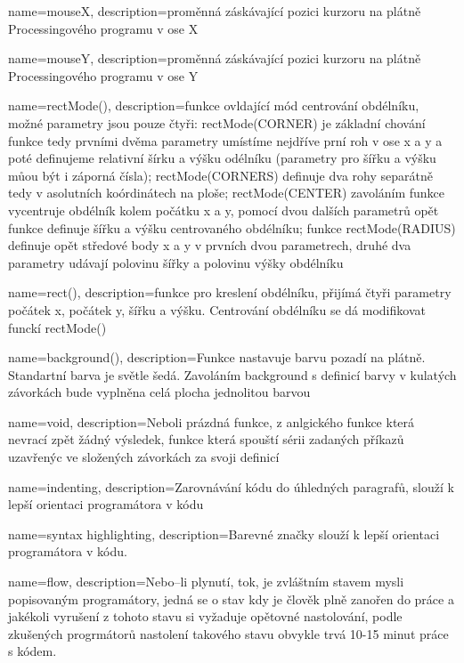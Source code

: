 {
  name={mouseX},
  description={proměnná záskávající pozici kurzoru na plátně Processingového programu v ose X}
}

{
  name={mouseY},
  description={proměnná záskávající pozici kurzoru na plátně Processingového programu v ose Y}
}

{
  name={rectMode()},
  description={funkce ovldající mód centrování obdélníku, možné parametry jsou pouze čtyři:  rectMode(CORNER) je základní chování funkce  tedy prvními dvěma parametry umístíme nejdříve prní roh v ose x a y a poté definujeme relativní šírku a výšku odélníku (parametry pro šířku a výšku můou být i záporná čísla); rectMode(CORNERS) definuje dva rohy separátně tedy v asolutních koórdinátech na ploše; rectMode(CENTER) zavoláním funkce  vycentruje obdélník kolem počátku x a y, pomocí dvou dalších parametrů opět funkce  definuje šířku a výšku centrovaného obdélníku; funkce rectMode(RADIUS) definuje opět středové body x a y v prvních dvou parametrech, druhé dva parametry udávají polovinu šířky a polovinu výšky obdélníku}
}

{
  name={rect()},
  description={funkce pro kreslení obdélníku, přijímá čtyři parametry počátek x, počátek y, šířku a výšku. Centrování obdélníku se dá modifikovat funckí rectMode()}
}

{
  name={background()},
  description={Funkce nastavuje barvu pozadí na plátně. Standartní barva je světle šedá. Zavoláním background s definicí barvy v kulatých závorkách bude vyplněna celá plocha jednolitou barvou}
}


{
  name={void},
  description={Neboli prázdná funkce, z anlgického  funkce která nevrací zpět žádný výsledek, funkce která spouští sérii zadaných příkazů uzavřenýc ve složených závorkách za svoji definicí}
}

{
  name={indenting},
  description={Zarovnávání kódu do úhledných paragrafů, slouží k lepší orientaci programátora v kódu}
}


{
  name={syntax highlighting},
  description={Barevné značky slouží k lepší orientaci programátora v kódu.}
}

{
  name={flow},
  description={Nebo--li plynutí, tok, je zvláštním stavem mysli popisovaným programátory, jedná se o stav kdy je člověk plně zanořen do práce a jakékoli vyrušení z tohoto stavu si vyžaduje opětovné nastolování, podle zkušených progrmátorů nastolení takového stavu obvykle trvá 10-15 minut práce s kódem.}
}

